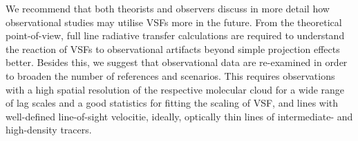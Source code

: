 
We recommend that both theorists and observers discuss in more detail how observational studies may utilise VSFs more in the future.
From the theoretical point-of-view, full line radiative transfer calculations are required to understand the reaction of VSFs to observational artifacts beyond simple projection effects better.
 Besides this, we suggest that observational data are re-examined in order to broaden the number of references and scenarios. 
This requires observations with a high spatial resolution of the respective molecular cloud for a wide range of lag scales and a good statistics for fitting the scaling of VSF, and lines with well-defined line-of-sight velocitie, ideally, optically thin lines of intermediate- and high-density tracers. 











